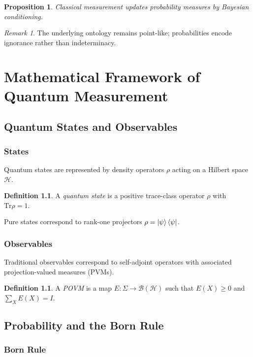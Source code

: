 \documentclass[12pt]{book}
\theoremstyle{plain}
\newtheorem{proposition}[theorem]{Proposition}
\theoremstyle{definition}
\newtheorem{definition}[theorem]{Definition}
\theoremstyle{remark}
\newtheorem{remark}[theorem]{Remark}
\begin{document}
\begin{proposition}
Classical measurement updates probability measures by Bayesian conditioning.
\end{proposition}

\begin{remark}
The underlying ontology remains point-like; probabilities encode ignorance rather than indeterminacy.
\end{remark}

\part{Mathematical Framework of Quantum Measurement}

\chapter{Quantum States and Observables}

\section{States}
Quantum states are represented by density operators $\rho$ acting on a Hilbert space $\mathcal{H}$.

\begin{definition}
A \emph{quantum state} is a positive trace-class operator $\rho$ with $\mathrm{Tr}\rho = 1$.
\end{definition}

Pure states correspond to rank-one projectors $\rho = \ket{\psi}\bra{\psi}$.

\section{Observables}
Traditional observables correspond to self-adjoint operators with associated projection-valued measures (PVMs).

\begin{definition}
A \emph{POVM} is a map $E : \Sigma \to \mathcal{B}(\mathcal{H})$ such that $E(X) \ge 0$ and $\sum_X E(X)=I$.
\end{definition}

\chapter{Probability and the Born Rule}

\section{Born Rule}
\end{document}
